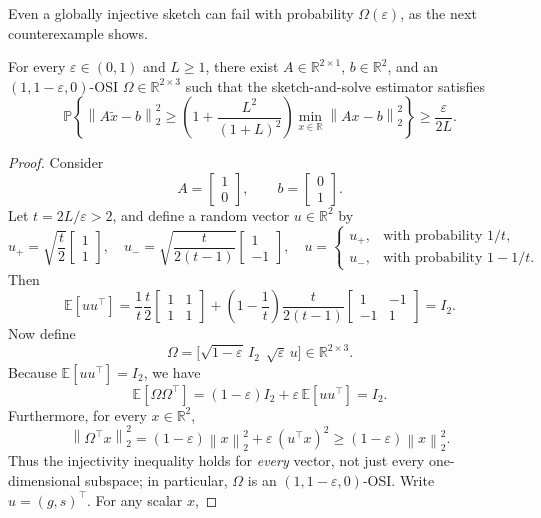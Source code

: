 \documentclass[onefignum,onetabnum]{siamart251216}
\newcommand{\R}{\mathbb{R}}
\newcommand{\E}{\mathbb{E}}
\newcommand{\Prob}{\mathbb{P}}
\newcommand{\norm}[1]{\left\lVert #1 \right\rVert}
\newcommand{\eps}{\varepsilon}
\begin{document}
Even a globally injective sketch can fail with probability $\Omega(\eps)$, as the next counterexample shows. 

\begin{theorem}\label{thm:ls-stronger}
For every $\eps\in (0,1)$ and $L\geq 1$, there exist $A\in\R^{2\times 1}$, $b\in\R^2$, and an $(1,1-\eps,0)$-OSI $\Omega\in\R^{2\times 3}$ such that the sketch-and-solve estimator satisfies
\[
\Prob\!\left\{ \norm{A\widetilde x-b}_2^2 \ge \left(1 + \frac{L^2}{(1+L)^2}\right) \min_{x\in\R} \norm{Ax-b}_2^2 \right\} \ge \frac{\eps}{2L}.
\]
\end{theorem}

\begin{proof}
Consider
\[
A = \begin{bmatrix}1\\0\end{bmatrix},
\qquad
b = \begin{bmatrix}0\\1\end{bmatrix}.
\]
Let $t = 2L/\eps>2$, and define a random vector $u\in\R^2$ by
\[
u_+ = \sqrt{\frac{t}{2}}\begin{bmatrix}1\\1\end{bmatrix},
\quad
u_- = \sqrt{\frac{t}{2(t-1)}}\begin{bmatrix}1\\-1\end{bmatrix},
\quad
u =
\begin{cases}
u_+, & \text{with probability } 1/t,\\[1mm]
u_-, & \text{with probability } 1-1/t.
\end{cases}
\]
Then
\[
\E[uu^\top]
= \frac{1}{t}\frac{t}{2}
\begin{bmatrix}1&1\\1&1\end{bmatrix}
+ \left(1-\frac{1}{t}\right)\frac{t}{2(t-1)}
\begin{bmatrix}1&-1\\-1&1\end{bmatrix}
= I_2.
\]
Now define
\[
\Omega = \bigl[\sqrt{1-\eps}\,I_2 \ \ \sqrt{\eps}\,u\bigr] \in \R^{2\times 3}.
\]
Because $\E[uu^\top]=I_2$, we have
\[
\E[\Omega\Omega^\top] = (1-\eps)I_2 + \eps\,\E[uu^\top] = I_2.
\]
Furthermore, for every $x\in\R^2$,
\[
\norm{\Omega^\top x}_2^2 = (1-\eps)\norm{x}_2^2 + \eps\,(u^\top x)^2 \ge (1-\eps)\norm{x}_2^2.
\]
Thus the injectivity inequality holds for \emph{every} vector, not just every one-dimensional subspace; in particular, $\Omega$ is an $(1,1-\eps,0)$-OSI.  Write $u=(g,s)^\top$. For any scalar $x$,

\end{proof}
\end{document}
